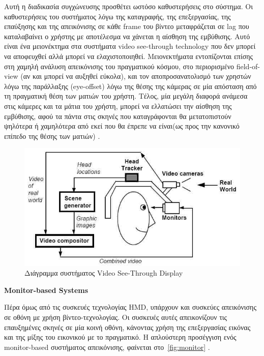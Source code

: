 Αυτή η διαδικασία συγχώνευσης προσθέτει ωστόσο καθυστερήσεις στο σύστημα. Οι καθυστερήσεις του συστήματος λόγω της καταγραφής, της επεξεργασίας, της επαύξησης και της απεικόνισης σε κάθε frame του βίντεο μεταφράζεται σε lag που καταλαβαίνει ο χρήστης με αποτέλεσμα να χάνεται η αίσθηση της εμβύθισης. Αυτό είναι ένα μειονέκτημα στα συστήματα video see-through technology που δεν μπορεί να αποφευχθεί αλλά μπορεί να ελαχιστοποιηθεί. Μειονεκτήματα εντοπίζονται επίσης στη χαμηλή ανάλυση απεικόνισης του πραγματικού κόσμου, στο περιορισμένο field-of-view (αν και μπορεί να αυξηθεί εύκολα), και τον αποπροσανατολισμό των χρηστών λόγω της παράλλαξης (eye-offset) λόγω της θέσης της κάμερας σε μία απόσταση από τη πραγματική θέση των ματιών του χρήστη. Τέλος, μία μεγάλη διαφορά ανάμεσα στις κάμερες και τα μάτια του χρήστη, μπορεί να ελλατώσει την αίσθηση της εμβύθισης, αφού τα πάντα στις σκηνές που καταγράφονται θα μετατοπιστούν ψηλότερα ή χαμηλότερα από εκεί που θα έπρεπε να είναι(ως προς την κανονικό επίπεδο της θέσης των ματιών) \cite{Malik2002} . 



\begin{figure}[H]
    \centering
    \includegraphics[scale=0.8, angle=0]{Files/Figures/videoseethrough.jpg}
    \caption[Διάγραμμα συστήματος Video See-Through Display \cite{azuma1997}]{ Διάγραμμα συστήματος Video See-Through Display \cite{azuma1997}}
    \label{fig:videoseethrough}
\end{figure}


\textbf{Monitor-based Systems}


Πέρα όμως από τις συσκευές τεχνολογίας HMD, υπάρχουν και συσκεύες απεικόνισης σε οθόνη με χρήση βίντεο-τεχνολογίας. Οι συσκευές αυτές απεικονίζουν τις επαυξημένες σκηνές σε μία κοινή οθόνη, κάνοντας χρήση της επεξεργασίας εικόνας και της μίξης του εικονικού με το πραγματικό. Η απλούστερη προσέγγιση ενός monitor-based συστήματος απεικόνισης, φαίνεται στο~\ref{fig:monitor} .

